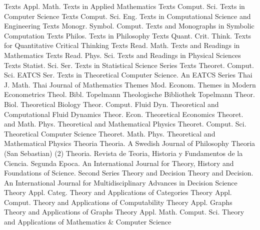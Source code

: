 {Texts Appl. Math.}
{Texts in Applied Mathematics}
{Texts Comput. Sci.}
{Texts in Computer Science}
{Texts Comput. Sci. Eng.}
{Texts in Computational Science and Engineering}
{Texts Monogr. Symbol. Comput.}
{Texts and Monographs in Symbolic Computation}
{Texts Philos.}
{Texts in Philosophy}
{Texts Quant. Crit. Think.}
{Texts for Quantitative Critical Thinking}
{Texts Read. Math.}
{Texts and Readings in Mathematics}
{Texts Read. Phys. Sci.}
{Texts and Readings in Physical Sciences}
{Texts Statist. Sci. Ser.}
{Texts in Statistical Science Series}
{Texts Theoret. Comput. Sci. EATCS Ser.}
{Texts in Theoretical Computer Science. An EATCS Series}
{Thai J. Math.}
{Thai Journal of Mathematics}
{Themes Mod. Econom.}
{Themes in Modern Econometrics}
{Theol. Bibl. Topelmann}
{Theologische Bibliothek Topelmann}
{Theor. Biol.}
{Theoretical Biology}
{Theor. Comput. Fluid Dyn.}
{Theoretical and Computational Fluid Dynamics}
{Theor. Econ.}
{Theoretical Economics}
{Theoret. and Math. Phys.}
{Theoretical and Mathematical Physics}
{Theoret. Comput. Sci.}
{Theoretical Computer Science}
{Theoret. Math. Phys.}
{Theoretical and Mathematical Physics}
{Theoria}
{Theoria. A Swedish Journal of Philosophy}
{Theoria (San Sebastian) (2)}
{Theoria. Revista de Teoria, Historia y Fundamentos de la Ciencia. Segunda Epoca. An International Journal for Theory, History and Foundations of Science. Second Series}
{Theory and Decision}
{Theory and Decision. An International Journal for Multidisciplinary Advances in Decision Science}
{Theory Appl. Categ.}
{Theory and Applications of Categories}
{Theory Appl. Comput.}
{Theory and Applications of Computability}
{Theory Appl. Graphs}
{Theory and Applications of Graphs}
{Theory Appl. Math. Comput. Sci.}
{Theory and Applications of Mathematics & Computer Science}
